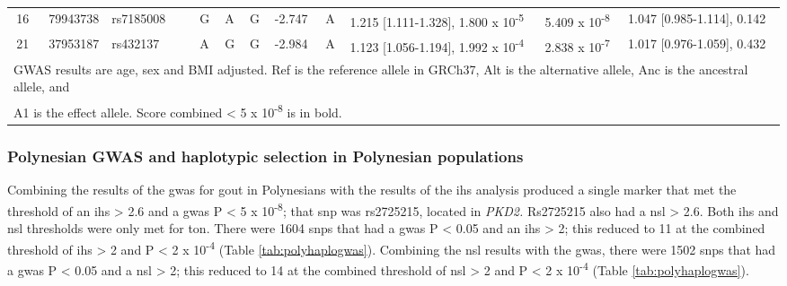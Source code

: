 \documentclass[twoside,openright]{report}
\begin{document}
\begin{landscape}
\begin{table}
{\begin{tabular}[t]{rrllllllllll}
\hspace{1em}16 & 79943738 & rs7185008 & \em{} & G & A & G & -2.747 & A & 1.215 [1.111-1.328], 1.800 x 10\textsuperscript{-5} & 5.409 x 10\textsuperscript{-8} & 1.047 [0.985-1.114], 0.142\\
\hspace{1em}21 & 37953187 & rs432137 & \em{} & A & G & G & -2.984 & A & 1.123 [1.056-1.194], 1.992 x 10\textsuperscript{-4} & 2.838 x 10\textsuperscript{-7} & 1.017 [0.976-1.059], 0.432\\
\bottomrule
\multicolumn{12}{l}{GWAS results are age, sex and BMI adjusted. Ref is the reference allele in GRCh37, Alt is the alternative allele, Anc is the ancestral allele, and}\\
\multicolumn{12}{l}{A1 is the effect allele. Score combined < 5 x 10\textsuperscript{-8} is in bold.}\\
\end{tabular}}
\end{table}
\end{landscape}

\subsubsection{Polynesian GWAS and haplotypic selection in Polynesian
populations}\label{polynesian-gwas-and-haplotypic-selection-in-polynesian-populations}

Combining the results of the \gls{gwas} for gout in Polynesians with the
results of the \gls{ihs} analysis produced a single marker that met the
threshold of an \textbar{}\gls{ihs}\textbar{} \textgreater{} 2.6 and a
\gls{gwas} P \textless{} 5 x 10\textsuperscript{-8}; that \gls{snp} was
rs2725215, located in \emph{PKD2.} Rs2725215 also had a
\textbar{}\gls{nsl}\textbar{} \textgreater{} 2.6. Both \gls{ihs} and
\gls{nsl} thresholds were only met for \gls{ton}. There were 1604
\glspl{snp} that had a \gls{gwas} P \textless{} 0.05 and an
\textbar{}\gls{ihs}\textbar{} \textgreater{} 2; this reduced to 11 at
the combined threshold of \textbar{}\gls{ihs}\textbar{} \textgreater{} 2
and P \textless{} 2 x 10\textsuperscript{-4} (Table
\ref{tab:polyhaplogwas}). Combining the \gls{nsl} results with the
\gls{gwas}, there were 1502 \glspl{snp} that had a \gls{gwas} P
\textless{} 0.05 and a \textbar{}\gls{nsl}\textbar{} \textgreater{} 2;
this reduced to 14 at the combined threshold of
\textbar{}\gls{nsl}\textbar{} \textgreater{} 2 and P \textless{} 2 x
10\textsuperscript{-4} (Table \ref{tab:polyhaplogwas}).
\end{document}
